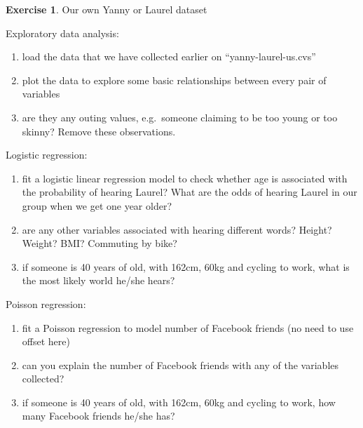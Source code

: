 \documentclass[
]{book}
\providecommand{\tightlist}{%
  \setlength{\itemsep}{0pt}\setlength{\parskip}{0pt}}
\theoremstyle{definition}
\theoremstyle{definition}
\theoremstyle{definition}
\newtheorem{exercise}{Exercise}[chapter]
\theoremstyle{remark}
\begin{document}
\begin{exercise}
\protect\hypertarget{exr:glm-yanny}{}{\label{exr:glm-yanny} }Our own Yanny or Laurel dataset

Exploratory data analysis:

\begin{enumerate}
\def\labelenumi{\alph{enumi})}
\tightlist
\item
  load the data that we have collected earlier on ``yanny-laurel-us.cvs''
\item
  plot the data to explore some basic relationships between every pair of variables
\item
  are they any outing values, e.g.~someone claiming to be too young or too skinny? Remove these observations.
\end{enumerate}

Logistic regression:

\begin{enumerate}
\def\labelenumi{\alph{enumi})}
\setcounter{enumi}{3}
\tightlist
\item
  fit a logistic linear regression model to check whether age is associated with the probability of hearing Laurel? What are the odds of hearing Laurel in our group when we get one year older?
\item
  are any other variables associated with hearing different words? Height? Weight? BMI? Commuting by bike?
\item
  if someone is 40 years of old, with 162cm, 60kg and cycling to work, what is the most likely world he/she hears?
\end{enumerate}

Poisson regression:

\begin{enumerate}
\def\labelenumi{\alph{enumi})}
\setcounter{enumi}{5}
\tightlist
\item
  fit a Poisson regression to model number of Facebook friends (no need to use offset here)
\item
  can you explain the number of Facebook friends with any of the variables collected?
\item
  if someone is 40 years of old, with 162cm, 60kg and cycling to work, how many Facebook friends he/she has?
\end{enumerate}
\end{exercise}
\end{document}
